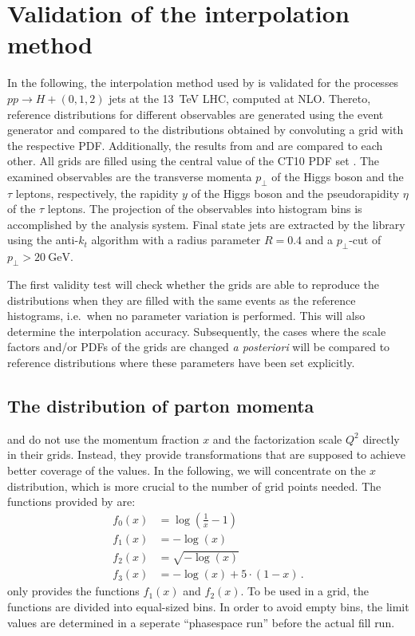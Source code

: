 
\chapter{Validation of the interpolation method}
\label{ch:validation}
%
In the following, the interpolation method used by \mcgrid{} is validated for the processes $pp \rightarrow H + (0,1,2)$ jets at the \SI{13}{\tera\electronvolt} LHC, computed at NLO.
Thereto, reference distributions for different observables are generated using the \sherpa{} event generator and compared to the distributions obtained by convoluting a grid with the respective PDF.
Additionally, the results from \appl{} and \fnlo{} are compared to each other.
All grids are filled using the central value of the CT10 PDF set \cite{ct10}.
The examined observables are the transverse momenta $p_\perp$ of the Higgs boson and the $\tau$ leptons, respectively, the rapidity $y$ of the Higgs boson and the pseudorapidity $\eta$ of the $\tau$ leptons.
The projection of the observables into histogram bins is accomplished by the \rivet{} analysis system.
Final state jets are extracted by the \fastjet{} library \cite{fastjet_manual} using the anti-$k_t$ algorithm \cite{anti_kt} with a radius parameter $R=0.4$ and a $p_\perp$-cut of $p_\perp > \SI{20}{\giga\electronvolt}$.

The first validity test will check whether the grids are able to reproduce the distributions when they are filled with the same events as the reference histograms, i.e.\ when no parameter variation is performed.
This will also determine the interpolation accuracy.
Subsequently, the cases where the scale factors and/or PDFs of the grids are changed \textit{a posteriori} will be compared to reference distributions where these parameters have been set explicitly.
%
\section{The distribution of parton momenta}
\label{sec:xtransform}
\appl{} and \fnlo{} do not use the momentum fraction $x$ and the factorization scale $Q^2$ directly in their grids.
Instead, they provide transformations that are supposed to achieve better coverage of the values.
In the following, we will concentrate on the $x$ distribution, which is more crucial to the number of grid points needed.
The functions provided by \appl{} are:
%
\begin{align}
	f_0(x)	&= \log(\frac{1}{x} -1) \\
	f_1(x)	&= -\log(x) \\
	f_2(x)	&= \sqrt{-\log(x)} \\
	f_3(x)	&= -\log(x) + 5 \cdot (1-x) \, .
\end{align}
%
\fnlo{} only provides the functions $f_1(x)$ and $f_2(x)$.
To be used in a grid, the functions are divided into equal-sized bins.
In order to avoid empty bins, the limit values are determined in a seperate \enquote{phasespace run} before the actual fill run.

